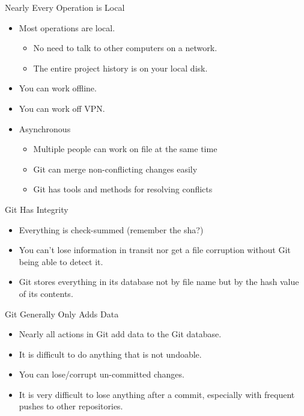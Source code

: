 \begin{frame}[t]{Nearly Every Operation is Local}
  \begin{itemize}
    \item Most operations are local.
      \begin{itemize}
        \item No need to talk to other computers on a network.
        \item The entire project history is on your local disk.
      \end{itemize}

    \item You can work offline.
    \item You can work off VPN.  

    \item Asynchronous
      \begin{itemize}
        \item Multiple people can work on file at the same time
        \item Git can merge non-conflicting changes easily
        \item Git has tools and methods for resolving conflicts
      \end{itemize}
  \end{itemize}
\end{frame}

\begin{frame}[t]{Git Has Integrity}
  \begin{itemize}
    \item Everything is check-summed (remember the sha?)
    \item You can't lose information in transit nor get a file corruption without
      Git being able to detect it.
    \item Git stores everything in its database not by file name but by the hash
      value of its contents.
  \end{itemize}
\end{frame}

\begin{frame}[t]{Git Generally Only Adds Data}
  \begin{itemize}
    \item Nearly all actions in Git add data to the Git database.
    \item It is difficult to do anything that is not undoable.
    \item You can lose/corrupt un-committed changes.
    \item It is very difficult to lose anything after a commit, especially with
      frequent pushes to other repositories.
  \end{itemize}
\end{frame}

